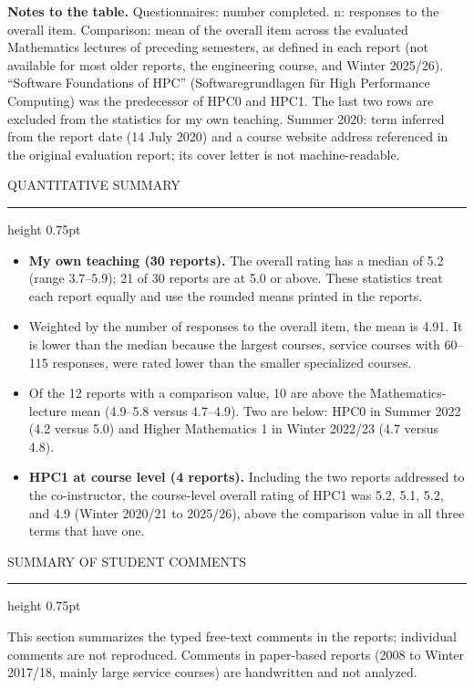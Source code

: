 \documentclass[10pt]{article}
\newcommand{\headsize}{\fontsize{10.5pt}{12.8pt}\selectfont}
\newcommand{\smallsize}{\fontsize{9.5pt}{11.6pt}\selectfont}
\newcommand{\cvsection}[1]{%
  \par\vspace{9pt}%
  {\headsize\bfseries\color{heading}\strut#1\par}%
  \nopagebreak\vspace{1pt}%
  {\color{rule}\hrule height 0.75pt}%
  \nopagebreak\vspace{3pt}%
  \prevdepth=2.7pt\relax
}
\newcommand{\para}[1]{{#1\par}\vspace{3pt}}
\newenvironment{cvitems}
  {\begin{itemize}[label=•, leftmargin=15pt, labelwidth=10pt, labelsep=0pt,
                   align=left, topsep=0pt, partopsep=0pt, parsep=0pt,
                   itemsep=2pt, beginpenalty=10000]}
  {\end{itemize}\vspace{3pt}}
\begin{document}
{\vspace{3pt}
{\smallsize \textbf{Notes to the table.} Questionnaires: number completed. n: responses to the overall item. Comparison: mean of the overall item across the evaluated Mathematics lectures of preceding semesters, as defined in each report (not available for most older reports, the engineering course, and Winter 2025/26). “Software Foundations of HPC” (Softwaregrundlagen für High Performance Computing) was the predecessor of HPC0 and HPC1. The last two rows are excluded from the statistics for my own teaching. Summer 2020: term inferred from the report date (14 July 2020) and a course website address referenced in the original evaluation report; its cover letter is not machine-readable.\par}
}

\cvsection{QUANTITATIVE SUMMARY}

\begin{cvitems}
  \item \textbf{My own teaching (30 reports).} The overall rating has a median of 5.2 (range 3.7–5.9); 21 of 30 reports are at 5.0 or above. These statistics treat each report equally and use the rounded means printed in the reports.
  \item Weighted by the number of responses to the overall item, the mean is 4.91. It is lower than the median because the largest courses, service courses with 60–115 responses, were rated lower than the smaller specialized courses.
  \item Of the 12 reports with a comparison value, 10 are above the Mathematics-lecture mean (4.9–5.8 versus 4.7–4.9). Two are below: HPC0 in Summer 2022 (4.2 versus 5.0) and Higher Mathematics 1 in Winter 2022/23 (4.7 versus 4.8).
  \item \textbf{HPC1 at course level (4 reports).} Including the two reports addressed to the co-instructor, the course-level overall rating of HPC1 was 5.2, 5.1, 5.2, and 4.9 (Winter 2020/21 to 2025/26), above the comparison value in all three terms that have one.
\end{cvitems}

\cvsection{SUMMARY OF STUDENT COMMENTS}

\para{{\smallsize This section summarizes the typed free-text comments in the reports; individual comments are not reproduced. Comments in paper-based reports (2008 to Winter 2017/18, mainly large service courses) are handwritten and not analyzed.}}
\end{document}
